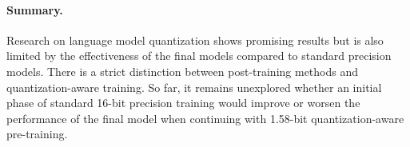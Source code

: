 \paragraph{Summary.}
Research on language model quantization shows promising results but is also limited by the effectiveness of the final models compared to standard precision models. There is a strict distinction between post-training methods and quantization-aware training. So far, it remains unexplored whether an initial phase of standard 16-bit precision training would improve or worsen the performance of the final model when continuing with 1.58-bit quantization-aware pre-training.